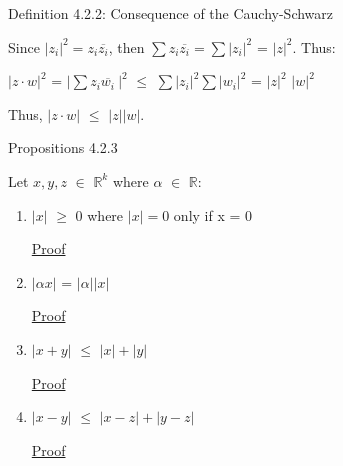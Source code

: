 	 \vspace{0.5cm}

{ \color{blue} Definition 4.2.2: Consequence of the Cauchy-Schwarz }

	\begin{adjustbox}{minipage=14cm, right, vspace=0.1cm 0cm}
		Since $|z_i|^2 = z_i\overline{z_i}$, then
		$\sum z_i\overline{z_i} = \sum |z_i|^2$ = $|z|^2$. Thus:

		\hspace{1cm}
		$|z \cdot w|^2$ = $|\sum z_i\overline{w_i} \ |^2$
		$\leq$ $\sum |z_i|^2 \sum |w_i|^2$ = $|z|^2$ $|w|^2$

		Thus, $|z \cdot w|$ $\leq$ $|z| |w|$.
	\end{adjustbox}

\newpage

{ \color{blue} Propositions 4.2.3 } 

	\hspace{1cm}
	Let $x,y,z$ $\in$ $\mathbb{R}^k$ where $\alpha$ $\in$ $\mathbb{R}$:
	
	\begin{enumerate}[label=(\alph*), leftmargin=2cm, itemsep=0.1cm]
		\item $|x|$ $\geq$ 0 where $|x| = 0$ only if x = 0

			{ \color{magenta} \underline{Proof} }


		\item $|\alpha x|$ = $|\alpha| |x|$

			{ \color{magenta} \underline{Proof} }

	
		\item $|x+y|$ $\leq$ $|x| + |y|$

			{ \color{magenta} \underline{Proof} }


		\item $|x-y|$ $\leq$ $|x-z| + |y-z|$

			{ \color{magenta} \underline{Proof} }

	\end{enumerate}

